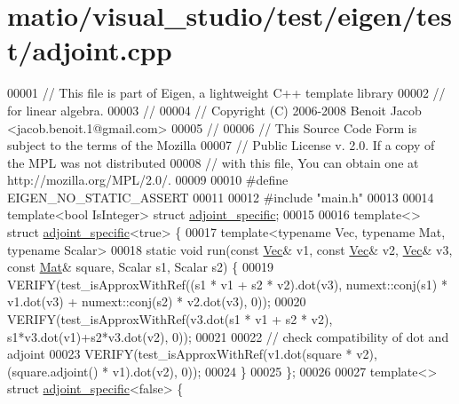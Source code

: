 \hypertarget{matio_2visual__studio_2test_2eigen_2test_2adjoint_8cpp_source}{}\section{matio/visual\+\_\+studio/test/eigen/test/adjoint.cpp}
\label{matio_2visual__studio_2test_2eigen_2test_2adjoint_8cpp_source}

\begin{DoxyCode}
00001 \textcolor{comment}{// This file is part of Eigen, a lightweight C++ template library}
00002 \textcolor{comment}{// for linear algebra.}
00003 \textcolor{comment}{//}
00004 \textcolor{comment}{// Copyright (C) 2006-2008 Benoit Jacob <jacob.benoit.1@gmail.com>}
00005 \textcolor{comment}{//}
00006 \textcolor{comment}{// This Source Code Form is subject to the terms of the Mozilla}
00007 \textcolor{comment}{// Public License v. 2.0. If a copy of the MPL was not distributed}
00008 \textcolor{comment}{// with this file, You can obtain one at http://mozilla.org/MPL/2.0/.}
00009 
00010 \textcolor{preprocessor}{#define EIGEN\_NO\_STATIC\_ASSERT}
00011 
00012 \textcolor{preprocessor}{#include "main.h"}
00013 
00014 \textcolor{keyword}{template}<\textcolor{keywordtype}{bool} IsInteger> \textcolor{keyword}{struct }\hyperlink{structadjoint__specific}{adjoint\_specific};
00015 
00016 \textcolor{keyword}{template}<> \textcolor{keyword}{struct }\hyperlink{structadjoint__specific}{adjoint\_specific}<true> \{
00017   \textcolor{keyword}{template}<\textcolor{keyword}{typename} Vec, \textcolor{keyword}{typename} Mat, \textcolor{keyword}{typename} Scalar>
00018   \textcolor{keyword}{static} \textcolor{keywordtype}{void} run(\textcolor{keyword}{const} \hyperlink{group___core___module_class_eigen_1_1_matrix}{Vec}& v1, \textcolor{keyword}{const} \hyperlink{group___core___module_class_eigen_1_1_matrix}{Vec}& v2, \hyperlink{group___core___module_class_eigen_1_1_matrix}{Vec}& v3, \textcolor{keyword}{const} \hyperlink{group___core___module}{Mat}& square, Scalar s1, Scalar 
      s2) \{
00019     VERIFY(test\_isApproxWithRef((s1 * v1 + s2 * v2).dot(v3),     numext::conj(s1) * v1.dot(v3) + 
      numext::conj(s2) * v2.dot(v3), 0));
00020     VERIFY(test\_isApproxWithRef(v3.dot(s1 * v1 + s2 * v2),       s1*v3.dot(v1)+s2*v3.dot(v2), 0));
00021     
00022     \textcolor{comment}{// check compatibility of dot and adjoint}
00023     VERIFY(test\_isApproxWithRef(v1.dot(square * v2), (square.adjoint() * v1).dot(v2), 0));
00024   \}
00025 \};
00026 
00027 \textcolor{keyword}{template}<> \textcolor{keyword}{struct }\hyperlink{structadjoint__specific}{adjoint\_specific}<false> \{

\end{DoxyCode}
